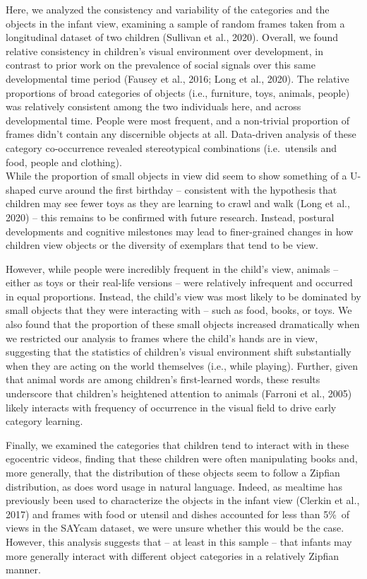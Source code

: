 \documentclass[10pt, letterpaper]{article}
\begin{document}
Here, we analyzed the consistency and variability of the categories and
the objects in the infant view, examining a sample of random frames
taken from a longitudinal dataset of two children (Sullivan et al.,
2020). Overall, we found relative consistency in children's visual
environment over development, in contrast to prior work on the
prevalence of social signals over this same developmental time period
(Fausey et al., 2016; Long et al., 2020). The relative proportions of
broad categories of objects (i.e., furniture, toys, animals, people) was
relatively consistent among the two individuals here, and across
developmental time. People were most frequent, and a non-trivial
proportion of frames didn't contain any discernible objects at all.
Data-driven analysis of these category co-occurrence revealed
stereotypical combinations (i.e.~utensils and food, people and
clothing).\\
While the proportion of small objects in view did seem to show something
of a U-shaped curve around the first birthday -- consistent with the
hypothesis that children may see fewer toys as they are learning to
crawl and walk (Long et al., 2020) -- this remains to be confirmed with
future research. Instead, postural developments and cognitive milestones
may lead to finer-grained changes in how children view objects or the
diversity of exemplars that tend to be view.

However, while people were incredibly frequent in the child's view,
animals -- either as toys or their real-life versions -- were relatively
infrequent and occurred in equal proportions. Instead, the child's view
was most likely to be dominated by small objects that they were
interacting with -- such as food, books, or toys. We also found that the
proportion of these small objects increased dramatically when we
restricted our analysis to frames where the child's hands are in view,
suggesting that the statistics of children's visual environment shift
substantially when they are acting on the world themselves (i.e., while
playing). Further, given that animal words are among children's
first-learned words, these results underscore that children's heightened
attention to animals (Farroni et al., 2005) likely interacts with
frequency of occurrence in the visual field to drive early category
learning.

Finally, we examined the categories that children tend to interact with
in these egocentric videos, finding that these children were often
manipulating books and, more generally, that the distribution of these
objects seem to follow a Zipfian distribution, as does word usage in
natural language. Indeed, as mealtime has previously been used to
characterize the objects in the infant view (Clerkin et al., 2017) and
frames with food or utensil and dishes accounted for less than 5\%~of
views in the SAYcam dataset, we were unsure whether this would be the
case. However, this analysis suggests that -- at least in this sample --
that infants may more generally interact with different object
categories in a relatively Zipfian manner.
\end{document}
